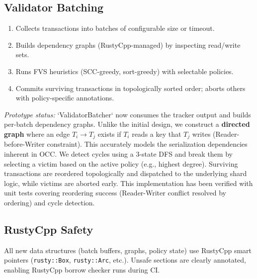 \documentclass[letterpaper,twocolumn,10pt]{article}
\begin{document}
\subsection{Validator Batching}
\begin{enumerate}[leftmargin=*]
  \item Collects transactions into batches of configurable size or timeout.
  \item Builds dependency graphs (RustyCpp-managed) by inspecting read/write sets.
  \item Runs FVS heuristics (SCC-greedy, sort-greedy) with selectable policies.
  \item Commits surviving transactions in topologically sorted order; aborts others with policy-specific annotations.
\end{enumerate}
\noindent\textit{Prototype status:} `ValidatorBatcher` now consumes the tracker output and builds per-batch dependency graphs. Unlike the initial design, we construct a \textbf{directed graph} where an edge $T_i \to T_j$ exists if $T_i$ reads a key that $T_j$ writes (Reader-before-Writer constraint). This accurately models the serialization dependencies inherent in OCC. We detect cycles using a 3-state DFS and break them by selecting a victim based on the active policy (e.g., highest degree). Surviving transactions are reordered topologically and dispatched to the underlying shard logic, while victims are aborted early. This implementation has been verified with unit tests covering reordering success (Reader-Writer conflict resolved by ordering) and cycle detection.

\subsection{RustyCpp Safety}
All new data structures (batch buffers, graphs, policy state) use RustyCpp smart pointers (\texttt{rusty::Box}, \texttt{rusty::Arc}, etc.). Unsafe sections are clearly annotated, enabling RustyCpp borrow checker runs during CI.
\end{document}
